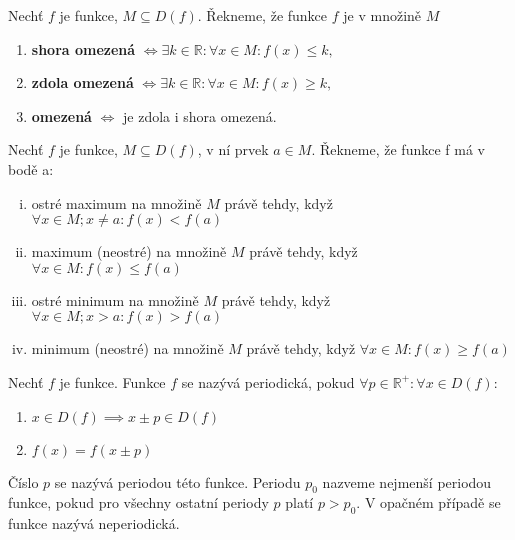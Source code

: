 \begin{definition}
  Nechť $f$ je funkce, $M\subseteq D(f)$. Řekneme, že funkce $f$ je v množině $M$
  \begin{enumerate}[$i.$]
    \item \textbf{shora omezená} $\iff \exists k \in \mathbb R: \forall x \in M: f(x)\leq k,$
    \item \textbf{zdola omezená} $\iff \exists k \in \mathbb R: \forall x \in M: f(x)\geq k,$
    \item \textbf{omezená} $\iff $ je zdola i shora omezená.
  \end{enumerate}
\end{definition}


\begin{definition}
  Nechť $f$ je funkce, $M \subseteq D(f)$, v ní prvek $a \in M$.
  Řekneme, že funkce f má v bodě a:
  \begin{enumerate}[i.]
    \item ostré maximum na množině $M$ právě tehdy, když $\forall x \in M; x \not = a: f(x) < f(a)$
    \item maximum (neostré) na množině $M$ právě tehdy, když $\forall x \in M : f(x) \leq f(a)$
    \item ostré minimum na množině $M$ právě tehdy, když $\forall x \in M; x > a: f(x) > f(a)$
    \item minimum (neostré) na množině $M$ právě tehdy, když $\forall x \in M : f(x) \geq f(a)$
  \end{enumerate}
\end{definition}

\begin{definition}
  Nechť $f$ je funkce. Funkce $f$ se nazývá periodická, pokud $\forall p \in \mathbb R^{+}: \forall x \in D(f):$
  \begin{enumerate}
    \item $x \in D(f) \implies x \pm p \in D(f)$
    \item $f(x) = f(x \pm p)$
  \end{enumerate}
  Číslo $p$ se nazývá periodou této funkce. Periodu $p_0$ nazveme nejmenší periodou funkce, pokud pro všechny ostatní periody $p$ platí $p > p_0$. V opačném případě se funkce nazývá neperiodická.
\end{definition}
